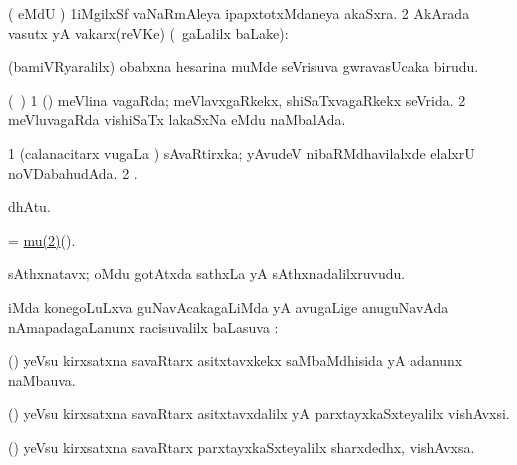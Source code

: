 \bentry
{}
\gl{\nA}
\bmng
( eMdU \parx) 
\bnum
\num{1}iMgilxSf vaNaRmAleya ipapxtotxMdaneya akaSxra. 
\num{2}  AkArada vasutx yA vakarx(reVKe) (\kanmu\ \saMpa gaLalilx baLake):  
\enum
\emng
\eentry

\bentry
{} 
\gl{\nA}
\expl{}
\bmng
(bamiVRyaralilx) obabxna hesarina muMde seVrisuva gwravasUcaka birudu. 
\emng
\eentry

\bentry
{} 
\gl{\gu}
\expl{}
\bmng
(\kanmu\ \birx) 
\bnum
\num{1} (\AmA) meVlina vagaRda; meVlavxgaRkekx, shiSaTxvagaRkekx seVrida. 
\num{2} meVluvagaRda vishiSaTx lakaSxNa eMdu naMbalAda. 
\enum
\emng
\eentry

\bentry
{} 
\gl{\saMkiSx}
\expl{}
\bmng
\bnum
\num{1} (calanacitarx \mo vugaLa \vi)  sAvaRtirxka; yAvudeV nibaRMdhavilalxde elalxrU noVDabahudAda. 
\num{2} . 
\enum
\emng
\eentry

\bentry
{} 
\gl{\saMkeV}
\expl{(\ravi) }
\bmng
{} dhAtu. 
\emng
\eentry

\bentry
{}
\gl{\pUparx}
\expl{}
\bmng
= \hyperref{kandict_m.pdf}{M}{mu(2)}{mu(2)}(\eng{$\mu$}). 
\emng
\eentry

\bentry
{}
\gl{\saMkiSx}
\expl{}
\bmng
{} 
\emng
\eentry

\bentry
{} 
\gl{\nA}
\expl{}
\bmng
sAthxnatavx; oMdu gotAtxda sathxLa yA sAthxnadalilxruvudu. 
\emng
\eentry

\bentry
{}
\gl{\uparx}
\expl{}
\bmng
{} iMda konegoLuLxva guNavAcakagaLiMda yA avugaLige anuguNavAda nAmapadagaLanunx racisuvalilx baLasuva \uparx:  
\emng
\eentry

\bentry
{} 
\gl{\gu}
\expl{}
\bmng
(\deVva) yeVsu kirxsatxna savaRtarx asitxtavxkekx saMbaMdhisida yA adanunx naMbauva. 
\emng
\eentry

\bentry
{} 
\gl{\nA}
\expl{}
\bmng
(\deVva) yeVsu kirxsatxna savaRtarx asitxtavxdalilx yA parxtayxkaSxteyalilx vishAvxsi. 
\emng
\eentry

\bentry
{} 
\gl{\nA}
\expl{}
\bmng
(\deVva) yeVsu kirxsatxna savaRtarx parxtayxkaSxteyalilx sharxdedhx, vishAvxsa. 
\emng
\eentry

